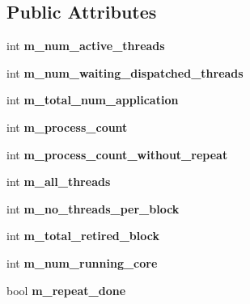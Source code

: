 \subsection*{Public Attributes}
\begin{DoxyCompactItemize}
\item 
\hypertarget{classmacsim__c_a4baff76941ebb6517b1f7cd6801ad075}{
int {\bfseries m\_\-num\_\-active\_\-threads}}
\label{classmacsim__c_a4baff76941ebb6517b1f7cd6801ad075}

\item 
\hypertarget{classmacsim__c_ad7d692896154e04fe7a9602398d5c5b8}{
int {\bfseries m\_\-num\_\-waiting\_\-dispatched\_\-threads}}
\label{classmacsim__c_ad7d692896154e04fe7a9602398d5c5b8}

\item 
\hypertarget{classmacsim__c_a1bdf950d03675bff1bf62fd6eebd0a51}{
int {\bfseries m\_\-total\_\-num\_\-application}}
\label{classmacsim__c_a1bdf950d03675bff1bf62fd6eebd0a51}

\item 
\hypertarget{classmacsim__c_a77281e97b7c4ca7804f97e37efc15090}{
int {\bfseries m\_\-process\_\-count}}
\label{classmacsim__c_a77281e97b7c4ca7804f97e37efc15090}

\item 
\hypertarget{classmacsim__c_a3229d7207c64d5f65f95c7d0ce117278}{
int {\bfseries m\_\-process\_\-count\_\-without\_\-repeat}}
\label{classmacsim__c_a3229d7207c64d5f65f95c7d0ce117278}

\item 
\hypertarget{classmacsim__c_a8e3d8337db16aa961dcbacbaba75f01d}{
int {\bfseries m\_\-all\_\-threads}}
\label{classmacsim__c_a8e3d8337db16aa961dcbacbaba75f01d}

\item 
\hypertarget{classmacsim__c_a2541778cf745506e34c7106b4b6a2884}{
int {\bfseries m\_\-no\_\-threads\_\-per\_\-block}}
\label{classmacsim__c_a2541778cf745506e34c7106b4b6a2884}

\item 
\hypertarget{classmacsim__c_adb713aaf9e8139239c4c9423b352d6de}{
int {\bfseries m\_\-total\_\-retired\_\-block}}
\label{classmacsim__c_adb713aaf9e8139239c4c9423b352d6de}

\item 
\hypertarget{classmacsim__c_a989dbbce57e8c6e00a7526cf7f22573c}{
int {\bfseries m\_\-num\_\-running\_\-core}}
\label{classmacsim__c_a989dbbce57e8c6e00a7526cf7f22573c}

\item 
\hypertarget{classmacsim__c_ae99ff07858f66a3b8bdaad27cba84ba6}{
bool {\bfseries m\_\-repeat\_\-done}}
\label{classmacsim__c_ae99ff07858f66a3b8bdaad27cba84ba6}


\end{DoxyCompactItemize}
